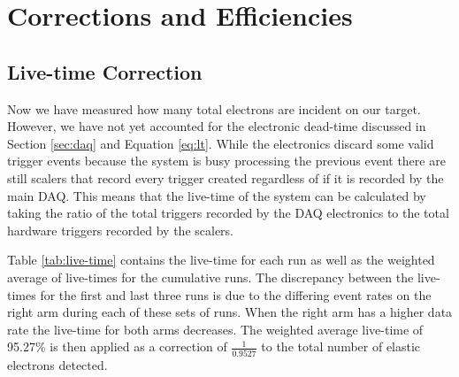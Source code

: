 \section{Corrections and Efficiencies}
\label{sec:cor_eff}

\subsection{Live-time Correction}
\label{ssec:live-time}

Now we have measured how many total electrons are incident on our target. However, we have not yet accounted for the electronic dead-time discussed in Section \ref{sec:daq} and Equation \ref{eq:lt}. While the electronics discard some valid trigger events because the system is busy processing the previous event there are still scalers that record every trigger created regardless of if it is recorded by the main DAQ. This means that the live-time of the system can be calculated by taking the ratio of the total triggers recorded by the DAQ electronics to the total hardware triggers recorded by the scalers. 

Table \ref{tab:live-time} contains the live-time for each run as well as the weighted average of live-times for the cumulative runs. The discrepancy between the live-times for the first and last three runs is due to the differing event rates on the right arm during each of these sets of runs. When the right arm has a higher data rate the live-time for both arms decreases. The weighted average live-time of 95.27$\%$ is then applied as a correction of $\frac{1}{0.9527}$ to the total number of elastic electrons detected.

\vspace{5mm}

